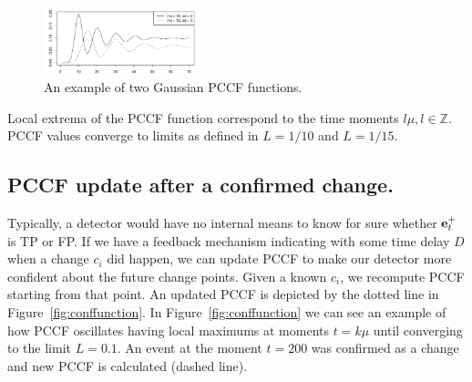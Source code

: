 \begin{figure}[htb!]
\centering
\includegraphics[width=0.40\textwidth]{articles/pics/sdm_paper/pccfExamples.pdf}
\caption{An example of two Gaussian PCCF functions.
}
\label{fig:pccf_example}
\end{figure}
Local extrema of the PCCF function correspond to the time moments $l \mu, l \in \mathbb{Z}$. %
PCCF values converge to limits as defined in  $L=1/10$ and $L=1/15$.

\subsection{PCCF update after a confirmed change.}
Typically, a detector would have no internal means to know for sure whether $\mathbf{e}_{t}^{+}$ is TP or FP.
If we have a feedback mechanism indicating with some time delay $D$ when a change $c_i$ did happen,
we can update PCCF to make our detector more confident about the future change points.
Given a known $c_i$, we recompute PCCF starting from that point.
An updated PCCF is depicted by the dotted line in Figure~\ref{fig:conffunction}.
In Figure~\ref{fig:conffunction} we can see an example of how PCCF oscillates having local maximums at moments $t = k \mu$ until converging to the limit $L=0.1$.
An event at the moment $t=200$ was confirmed as a change and new PCCF is calculated (dashed line).

